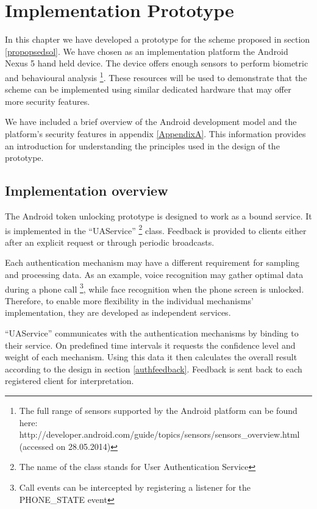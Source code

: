 
\chapter{Implementation Prototype} %

\label{Chapter4} %

In this chapter we have developed a prototype for the scheme proposed in section \ref{propopsedsol}. We have chosen as an implementation platform the Android Nexus 5 hand held device. The device offers enough sensors to perform biometric and behavioural analysis \footnote{The full range of sensors supported by the Android platform can be found here: http://developer.android.com/guide/topics/sensors/sensors\_overview.html (accessed on 28.05.2014)}. These resources will be used to demonstrate that the scheme can be implemented using similar dedicated hardware that may offer more security features.

We have included a brief overview of the Android development model and the platform's security features in appendix \ref{AppendixA}. This information provides an introduction for understanding the principles used in the design of the prototype.

\section{Implementation overview}
The Android token unlocking prototype is designed to work as a bound service. It is implemented in the ``UAService'' \footnote{The name of the class stands for User Authentication Service} class. Feedback is provided to clients either after an explicit request or through periodic broadcasts.

Each authentication mechanism may have a different requirement for sampling and processing data. As an example, voice recognition may gather optimal data during a phone call \footnote{Call events can be intercepted by registering a listener for the PHONE\_STATE event}, while face recognition when the phone screen is unlocked. Therefore, to enable more flexibility in the individual mechanisms' implementation, they are developed as independent services.

``UAService'' communicates with the authentication mechanisms by binding to their service. On predefined time intervals it requests the confidence level and weight of each mechanism. Using this data it then calculates the overall result according to the design in section \ref{authfeedback}. Feedback is sent back to each registered client for interpretation.

